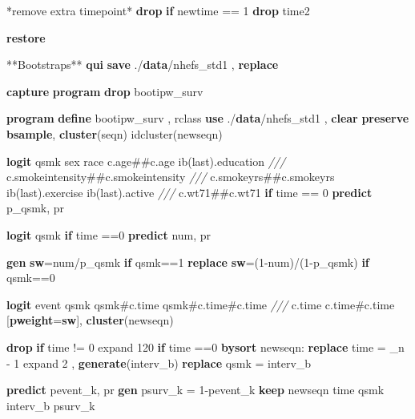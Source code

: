 \documentclass[
  10pt,
]{book}
\newenvironment{Shaded}{\begin{snugshade}}{\end{snugshade}}
\newcommand{\CommentTok}[1]{\textcolor[rgb]{0.56,0.35,0.01}{\textit{#1}}}
\newcommand{\DataTypeTok}[1]{\textcolor[rgb]{0.13,0.29,0.53}{#1}}
\newcommand{\FunctionTok}[1]{\textcolor[rgb]{0.00,0.00,0.00}{#1}}
\newcommand{\KeywordTok}[1]{\textcolor[rgb]{0.13,0.29,0.53}{\textbf{#1}}}
\newcommand{\NormalTok}[1]{#1}
\begin{document}
\begin{Shaded}
\begin{Highlighting}[]
\NormalTok{*remove extra timepoint*}
\KeywordTok{drop} \KeywordTok{if}\NormalTok{ newtime == 1}
\KeywordTok{drop}\NormalTok{ time2}

\KeywordTok{restore}

\NormalTok{**Bootstraps**}
\KeywordTok{qui} \KeywordTok{save}\NormalTok{ ./}\KeywordTok{data}\NormalTok{/nhefs_std1 , }\KeywordTok{replace}
 
\KeywordTok{capture} \KeywordTok{program} \KeywordTok{drop}\NormalTok{ bootipw_surv }

\KeywordTok{program} \KeywordTok{define}\NormalTok{ bootipw_surv , rclass}
\KeywordTok{use}\NormalTok{ ./}\KeywordTok{data}\NormalTok{/nhefs_std1 , }\KeywordTok{clear}
\KeywordTok{preserve}
\KeywordTok{bsample}\NormalTok{, }\KeywordTok{cluster}\NormalTok{(seqn) idcluster(newseqn)  	}
		
\KeywordTok{logit}\NormalTok{ qsmk sex race c.age##c.age ib(}\FunctionTok{last}\NormalTok{).education }\CommentTok{///}
\NormalTok{  c.smokeintensity##c.smokeintensity }\CommentTok{///}
\NormalTok{	c.smokeyrs##c.smokeyrs ib(}\FunctionTok{last}\NormalTok{).exercise ib(}\FunctionTok{last}\NormalTok{).active }\CommentTok{///}
\NormalTok{	c.wt71##c.wt71 }\KeywordTok{if}\NormalTok{ time == 0}
\KeywordTok{predict}\NormalTok{ p_qsmk, pr}

\KeywordTok{logit}\NormalTok{ qsmk }\KeywordTok{if}\NormalTok{ time ==0 }
\KeywordTok{predict}\NormalTok{ num, pr}

\KeywordTok{gen} \KeywordTok{sw}\NormalTok{=num/p_qsmk }\KeywordTok{if}\NormalTok{ qsmk==1}
\KeywordTok{replace} \KeywordTok{sw}\NormalTok{=(1-num)/(1-p_qsmk) }\KeywordTok{if}\NormalTok{ qsmk==0}

\KeywordTok{logit}\NormalTok{ event qsmk qsmk#c.time qsmk#c.time#c.time }\CommentTok{///}
\NormalTok{  c.time c.time#c.time [}\KeywordTok{pweight}\NormalTok{=}\KeywordTok{sw}\NormalTok{], }\KeywordTok{cluster}\NormalTok{(newseqn) }
	
\KeywordTok{drop} \KeywordTok{if}\NormalTok{ time != 0}
\NormalTok{expand 120 }\KeywordTok{if}\NormalTok{ time ==0 }
\KeywordTok{bysort}\NormalTok{ newseqn: }\KeywordTok{replace}\NormalTok{ time = }\DataTypeTok{_n}\NormalTok{ - 1		 }
\NormalTok{expand 2 , }\KeywordTok{generate}\NormalTok{(interv_b) }
\KeywordTok{replace}\NormalTok{ qsmk = interv_b	}
		
\KeywordTok{predict}\NormalTok{ pevent_k, pr}
\KeywordTok{gen}\NormalTok{ psurv_k = 1-pevent_k}
\KeywordTok{keep}\NormalTok{ newseqn time qsmk interv_b psurv_k }


\end{Highlighting}
\end{Shaded}
\end{document}
